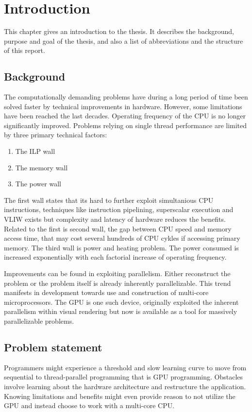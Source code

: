 \chapter{Introduction}\label{cha:intro}
This chapter gives an introduction to the thesis. It describes the background, purpose and goal of the thesis, and also a list of abbreviations and the structure of this report.

\section{Background}
The computationally demanding problems have during a long period of time been solved faster by technical improvements in hardware. However, some limitations have been reached the last decades. Operating frequency of the \gls{CPU} is no longer significantly improved. Problems relying on single thread performance are limited by three primary technical factors:
\begin{enumerate}
	\item The \gls{ILP} wall
	\item The memory wall
	\item The power wall
\end{enumerate}

The first wall states that its hard to further exploit simultanious \gls{CPU} instructions, techniques like instruction pipelining, superscalar execution and \gls{VLIW} exists but complexity and latency of hardware reduces the benefits. Related to the first is second wall, the gap between \gls{CPU} speed and memory access time, that may cost several hundreds of \gls{CPU} cykles if accessing primary memory. The third wall is power and heating problem. The power consumed is increased exponentially with each factorial increase of operating frequency.

Improvements can be found in exploiting parallelism. Either reconstruct the problem or the problem itself is already inherently parallelizable. This trend manifests in development towards use and construction of multi-core microprocessors. The \gls{GPU} is one such device, originally exploited the inherent parallelism within visual rendering but now is available as a tool for massively parallelizable problems.

\section{Problem statement}
Programmers might experience a threshold and slow learning curve to move from sequential to thread-parallel programming that is \gls{GPU} programming. Obstacles involve learning about the hardware architecture and restructure the application. Knowing limitations and benefits might even provide reason to not utilize the \gls{GPU} and instead choose to work with a multi-core CPU.

